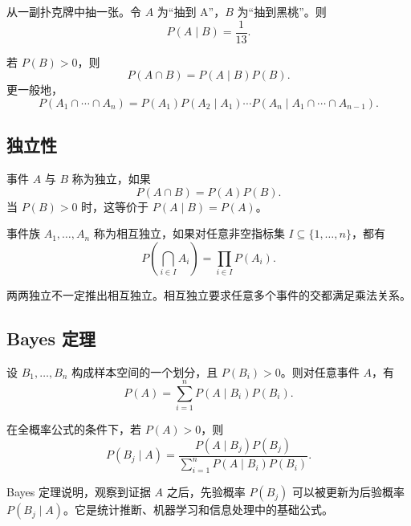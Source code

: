\begin{example}
从一副扑克牌中抽一张。令 $A$ 为“抽到 A”，$B$ 为“抽到黑桃”。则
\[
    P(A\mid B)=\frac{1}{13}.
\]
\end{example}

\begin{proposition}[乘法公式]
若 $P(B)>0$，则
\[
    P(A\cap B)=P(A\mid B)P(B).
\]
更一般地，
\[
    P(A_1\cap\cdots\cap A_n)
    =P(A_1)P(A_2\mid A_1)\cdots P(A_n\mid A_1\cap\cdots\cap A_{n-1}).
\]
\end{proposition}

\subsection{独立性}

\begin{definition}[事件独立]
事件 $A$ 与 $B$ 称为独立，如果
\[
    P(A\cap B)=P(A)P(B).
\]
当 $P(B)>0$ 时，这等价于 $P(A\mid B)=P(A)$。
\end{definition}

\begin{definition}[相互独立]
事件族 $A_1,\dots,A_n$ 称为相互独立，如果对任意非空指标集 $I\subseteq\{1,\dots,n\}$，都有
\[
    P\left(\bigcap_{i\in I}A_i\right)=\prod_{i\in I}P(A_i).
\]
\end{definition}

\begin{remark}
两两独立不一定推出相互独立。相互独立要求任意多个事件的交都满足乘法关系。
\end{remark}

\subsection{Bayes 定理}

\begin{theorem}[全概率公式]
设 $B_1,\dots,B_n$ 构成样本空间的一个划分，且 $P(B_i)>0$。则对任意事件 $A$，有
\[
    P(A)=\sum_{i=1}^n P(A\mid B_i)P(B_i).
\]
\end{theorem}

\begin{theorem}[Bayes 定理]
在全概率公式的条件下，若 $P(A)>0$，则
\[
    P(B_j\mid A)=
    \frac{P(A\mid B_j)P(B_j)}{\sum_{i=1}^n P(A\mid B_i)P(B_i)}.
\]
\end{theorem}

\begin{remark}
Bayes 定理说明，观察到证据 $A$ 之后，先验概率 $P(B_j)$ 可以被更新为后验概率 $P(B_j\mid A)$。它是统计推断、机器学习和信息处理中的基础公式。
\end{remark}

